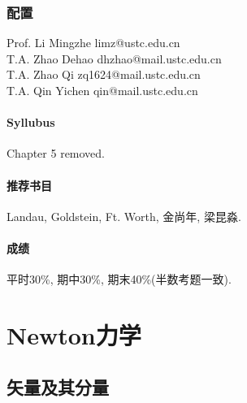 \documentclass[../LectureNotes.tex]{subfiles}
\begin{document}
\subsubsection*{配置} %
\label{ssub:配置}

\noindent
Prof. Li Mingzhe limz@ustc.edu.cn\\
T.A. Zhao Dehao dhzhao@mail.ustc.edu.cn\\
T.A. Zhao Qi zq1624@mail.ustc.edu.cn\\
T.A. Qin Yichen qin@mail.ustc.edu.cn

\paragraph{Syllubus} %
\label{par:syllubus}

Chapter 5 removed.


\paragraph{推荐书目} %
\label{par:推荐书目}

Landau, Goldstein, Ft. Worth, 金尚年, 梁昆淼.


\paragraph{成绩} %
\label{par:成绩}

平时30\%, 期中30\%, 期末40\%(半数考题一致).



\section{Newton力学} %
\label{sec:newton力学}

\subsection{矢量及其分量} %
\label{sub:矢量及其分量}
\end{document}
